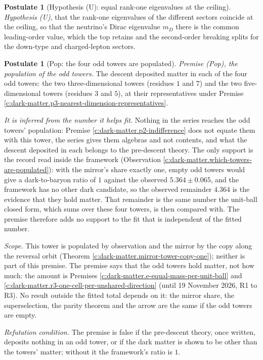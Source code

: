 \documentclass[11pt]{article}
\theoremstyle{definition}
\newtheorem{postulate}[theorem]{Postulate}
\theoremstyle{plain}
\begin{document}
\begin{postulate}[Hypothesis (U): equal rank-one eigenvalues at the ceiling]\label{c:dark-matter.hyp-u-equal-rank-one-eigenvalues}
\emph{Hypothesis (U)}, that the rank-one eigenvalues of the different sectors coincide at the ceiling, so that the neutrino's Dirac eigenvalue $m_{D}$ there is the common leading-order value, which the top retains and the second-order breaking splits for the down-type and charged-lepton sectors.
\end{postulate}

\begin{postulate}[Pop: the four odd towers are populated]\label{c:dark-matter.odd-towers-populated}
\emph{Premise (Pop), the population of the odd towers.} The descent deposited matter in each of the four odd towers: the two three-dimensional towers (residues $1$ and $7$) and the two five-dimensional towers (residues $3$ and $5$), at their representatives under Premise \ref{c:dark-matter.p3-nearest-dimension-representatives}.

\emph{It is inferred from the number it helps fit.} Nothing in the series reaches the odd towers' population: Premise \ref{c:dark-matter.p2-indifference} does not equate them with this tower, the series gives them algebras and not contents, and what the descent deposited in each belongs to the pre-descent theory. The only support is the record read inside the framework (Observation \ref{c:dark-matter.which-towers-are-populated}): with the mirror's share exactly one, empty odd towers would give a dark-to-baryon ratio of $1$ against the observed $5.364 \pm 0.065$, and the framework has no other dark candidate, so the observed remainder $4.364$ is the evidence that they hold matter. That remainder is the same number the unit-ball closed form, which sums over these four towers, is then compared with. The premise therefore adds no support to the fit that is independent of the fitted number.

\emph{Scope.} This tower is populated by observation and the mirror by the copy along the reversal orbit (Theorem \ref{c:dark-matter.mirror-tower-copy-one}); neither is part of this premise. The premise says that the odd towers hold matter, not how much: the amount is Premises \ref{c:dark-matter.e-equal-mass-per-unit-ball} and \ref{c:dark-matter.r3-one-cell-per-unshared-direction} (until 19 November 2026, R1 to R3). No result outside the fitted total depends on it: the mirror share, the superselection, the parity theorem and the arrow are the same if the odd towers are empty.

\emph{Refutation condition.} The premise is false if the pre-descent theory, once written, deposits nothing in an odd tower, or if the dark matter is shown to be other than the towers' matter; without it the framework's ratio is $1$.
\end{postulate}
\end{document}
